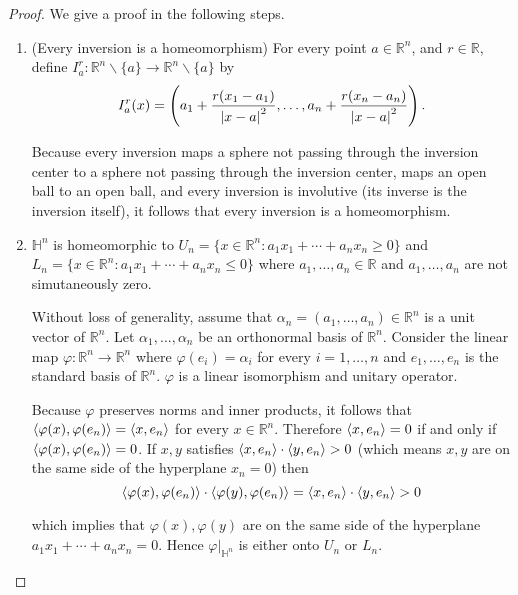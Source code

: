 \begin{proof}
	We give a proof in the following steps.
	\begin{enumerate}[label={\textbf{Step \arabic*.}},itemindent=1cm]
		\item (Every inversion is a homeomorphism) For every point $a\in\mathbb{R}^{n}$, and $r\in\mathbb{R}$, define $I^{r}_{a}: \mathbb{R}^{n}\smallsetminus\{ a \} \to \mathbb{R}^{n}\smallsetminus\{ a \}$ by
		      \[
			      I^{r}_{a}(x) = \left(a_{1} + \frac{r(x_{1} - a_{1})}{\left\vert{x - a}\right\vert^{2}}, \ldots, a_{n} + \frac{r(x_{n} - a_{n})}{\left\vert{x-a}\right\vert^{2}}\right).
		      \]

		      Because every inversion maps a sphere not passing through the inversion center to a sphere not passing through the inversion center, maps an open ball to an open ball, and every inversion is involutive (its inverse is the inversion itself), it follows that every inversion is a homeomorphism.
		\item $\mathbb{H}^{n}$ is homeomorphic to $U_{n} = \{ x\in\mathbb{R}^{n} : a_{1}x_{1} + \cdots + a_{n}x_{n} \geq 0 \}$ and $L_{n} = \{ x\in\mathbb{R}^{n} : a_{1}x_{1} + \cdots + a_{n}x_{n} \leq 0 \}$ where $a_{1}, \ldots, a_{n}\in\mathbb{R}$ and $a_{1}, \ldots, a_{n}$ are not simutaneously zero.

		      Without loss of generality, assume that $\alpha_{n} = (a_{1}, \ldots, a_{n})\in\mathbb{R}^{n}$ is a unit vector of $\mathbb{R}^{n}$. Let $\alpha_{1}, \ldots, \alpha_{n}$ be an orthonormal basis of $\mathbb{R}^{n}$. Consider the linear map $\varphi: \mathbb{R}^{n}\to \mathbb{R}^{n}$ where $\varphi(e_{i}) = \alpha_{i}$ for every $i = 1,\ldots, n$ and $e_{1}, \ldots, e_{n}$ is the standard basis of $\mathbb{R}^{n}$. $\varphi$ is a linear isomorphism and unitary operator.

		      Because $\varphi$ preserves norms and inner products, it follows that $\left\langle{\varphi(x), \varphi(e_{n})}\right\rangle = \left\langle{x, e_{n}}\right\rangle$ for every $x\in\mathbb{R}^{n}$. Therefore $\left\langle{x, e_{n}}\right\rangle = 0$ if and only if $\left\langle{\varphi(x), \varphi(e_{n})}\right\rangle = 0$. If $x, y$ satisfies $\left\langle{x, e_{n}}\right\rangle \cdot \left\langle{y, e_{n}}\right\rangle > 0$ (which means $x, y$ are on the same side of the hyperplane $x_{n} = 0$) then
		      \[
			      \left\langle{\varphi(x), \varphi(e_{n})}\right\rangle\cdot\left\langle{\varphi(y), \varphi(e_{n})}\right\rangle = \left\langle{x, e_{n}}\right\rangle\cdot\left\langle{y, e_{n}}\right\rangle > 0
		      \]

		      which implies that $\varphi(x), \varphi(y)$ are on the same side of the hyperplane $a_{1}x_{1} + \cdots + a_{n}x_{n} = 0$. Hence $\varphi\vert_{\mathbb{H}^{n}}$ is either onto $U_{n}$ or $L_{n}$.


\end{enumerate}
\end{proof}
